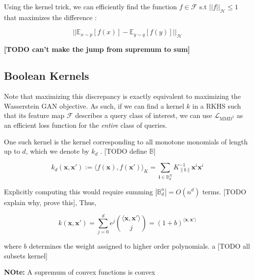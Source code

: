 \documentclass[
]{article}
\begin{document}
Using the kernel trick, we can efficiently find the function
$f \in \mathcal{F}$ s.t $||f||_\mathcal{H} \leq 1$ that maximizes the difference :

\[
  ||\mathbb{E}_{x\sim p}[f(x)] - \mathbb{E}_{y\sim q}[f(y)]||_\mathcal{H}
\]

\textbf{[TODO can't make the jump from supremum to sum]}



\subsection{Boolean Kernels}



Note that maximizing this discrepancy is exactly equivalent to
maximizing the Wasserstein GAN objective. As such, if we can find a
kernel \(k\) in a RKHS such that its feature map \(\mathcal{F}\) 
describes a query class of interest, we can use
\(\mathcal{L}_{\mathrm{MMD}^2}\) as an efficient loss function for the
\emph{entire} class of queries.

One such kernel is the kernel corresponding to all monotone monomials of
length up to \(d\), which we denote by \(k_d\) \cite{PLA18}. {[}TODO
define \(\mathbb{B}\){]}

\[
  k_d (\mathbf{x}, \mathbf{x}'):= \langle f(\mathbf{x}), f (\mathbf{x}')\rangle_{K}=\sum_{\mathbf{i} \in \mathbb{B}^N_d} K_{\|\mathbf{i}\|}^{-1} \mathbf{x}^i \mathbf{x}^i
\]

Explicitly computing this would require summing
\(|\mathbb{B}_d^n| = O(n^d)\) terms. {[}TODO explain why, prove this{]},
Thus,

\[k (\mathbf{x}, \mathbf{x}') = \sum_{j=0}^d e^j \binom{\langle\mathbf{x}, \mathbf{x}'\rangle}{j}
=(1+b)^{ \langle \mathbf{x}, \mathbf{x}'\rangle}\]


where \(b\) determines the weight assigned to higher order polynomials.
a
{[}TODO all subsets kernel{]}

\textbf{NOte:} A supremum of convex functions is convex



\end{document}
